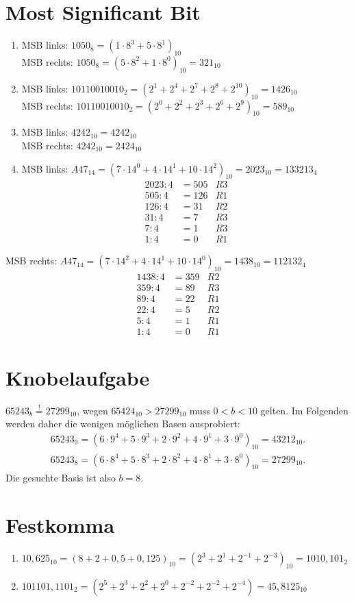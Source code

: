 \documentclass[a4paper]{article}
\begin{document}
\section{Most Significant Bit}
\begin{enumerate}[label=\alph*)]
	\item MSB links:  $1050_8 = (1 \cdot 8^3 + 5 \cdot 8^1)_{10}$ \\
		  MSB rechts: $1050_8 = (5 \cdot 8^2 + 1 \cdot 8^0)_{10} = 321_{10}$
		  
	\item MSB links: $10110010010_2 = (2^1 + 2^4 + 2^7 + 2^8 + 2^{10})_{10} = 1426_{10}$ \\
		MSB rechts: $10110010010_2 = (2^0 + 2^2 + 2^3 + 2^6 + 2^9)_{10} = 589_{10}$
	
	\item MSB links: $4242_{10} = 4242_{10}$ \\
		  MSB rechts: $4242_{10} = 2424_{10}$ 
		  
 	\item MSB links: $A47_{14} = (7 \cdot 14^0 + 4 \cdot 14^1 + 10 \cdot 14^2)_{10} = 2023_{10} = 133213_4$
 	\begin{align*}
 		2023 : 4 &= 505& R3 \\
 		505 : 4 &= 126& R1 \\
 		126 : 4 &= 31& R2 \\
 		31 : 4 &= 7& R3 \\
 		7 : 4 &= 1& R3 \\
 		1 : 4 &= 0& R1
 	\end{align*}
\end{enumerate}
		MSB rechts: $A47_{14} = (7 \cdot 14^2 + 4 \cdot 14^1 + 10 \cdot 14^0)_{10} = 1438_{10} = 112132_{4}$
		\begin{align*}
		1438 : 4 &= 359& R2 \\
		359 : 4 &= 89& R3 \\
		89 : 4 &= 22& R1 \\
		22 : 4 &= 5& R2 \\
		5 : 4 &= 1& R1 \\
		1 : 4 &= 0& R1
		\end{align*}
		
\section{Knobelaufgabe}
$65243_b \stackrel{!}{=} 27299_{10}$, wegen $65424_{10} > 27299_{10}$ muss $0 < b < 10$ gelten. Im Folgenden werden daher die wenigen möglichen Basen ausprobiert:
\begin{align*}
	65243_{9} = (6\cdot9^4 + 5 \cdot 9^3 + 2 \cdot 9^2 + 4 \cdot 9^1 + 3 \cdot 9^0)_{10} = 43212_{10}. \\
	65243_{8} = (6\cdot8^4 + 5 \cdot 8^3 + 2 \cdot 8^2 + 4 \cdot 8^1 + 3 \cdot 8^0)_{10} = 27299_{10}. 
\end{align*}
Die gesuchte Basis ist also $b = 8$.

\section{Festkomma}
	\begin{enumerate}[label=\alph*)]
		\item 
		$10,625_{10} = (8 + 2 + 0,5 + 0,125)_{10} = (2^3 + 2^1 + 2^{-1} + 2^{-3})_{10} = 1010,101_2$
		
		\item 
		$101101,1101_2 = (2^5 + 2^3  + 2^2 + 2^0 + 2^{-2} + 2^{-2} + 2^{-4}) = 45,8125_{10}$
	\end{enumerate}
\end{document}
